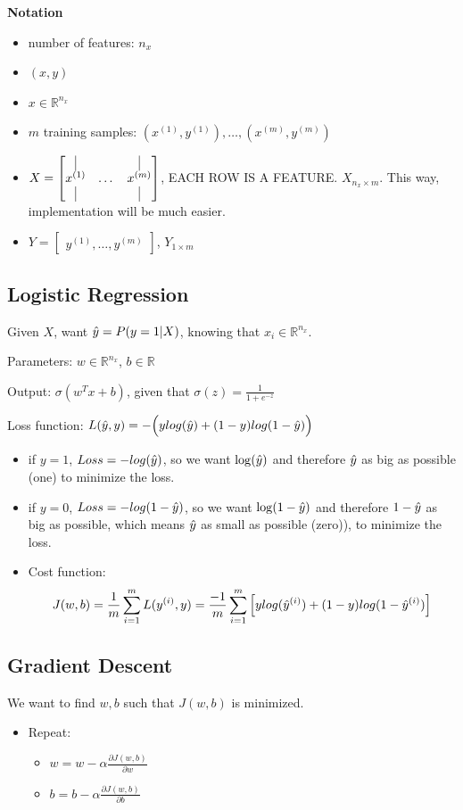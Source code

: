 
\textbf{Notation}
\begin{itemize}
	\item number of features: $n_x$
	\item $(x, y)$
	\item $x \in \mathbb{R}^{n_x}$
	\item $m$ training samples: $(x^{(1)}, y^{(1)}), \dots, (x^{(m)}, y^{(m)})$
	\item $X = \begin{bmatrix}
	\vline & & \vline \\
	x^{(1)} & \dots & x^{(m)}\\ 
	\vline & & \vline \\
	\end{bmatrix}$, EACH ROW IS A FEATURE. $X_{n_x \times m}$. This way, implementation will be much easier. 
	\item $Y = \begin{bmatrix}
	y^{(1)}, \dots, y^{(m)}
	\end{bmatrix}$, $Y_{1\times m}$
\end{itemize}

\subsection{Logistic Regression}
Given $X$, want $\hat{y} = P(y=1|X)$, knowing that $x_i \in \mathbb{R}^{n_x}$. 

Parameters: $w \in \mathbb{R}^{n_x}$, $b \in \mathbb{R}$

Output: $\sigma(w^Tx + b)$, given that $\sigma(z) = \frac{1}{1+e^{-z}}$

Loss function: $L(\hat{y}, y) = -\Big(ylog(\hat{y}) + (1-y)log(1-\hat{y})\Big)$
\begin{itemize}
	\item if $y = 1$, $Loss = - log(\hat{y})$, so we want $\log(\hat{y})$ and therefore $\hat{y}$ as big as possible (one) to minimize the loss. 
	\item if $y = 0$, $Loss = - log(1-\hat{y})$, so we want $\log(1-\hat{y})$ and therefore $1-\hat{y}$ as big as possible, which means $\hat{y}$ as small as possible (zero)), to minimize the loss. 

	\item Cost function: 
$$
J(w, b) = \frac{1}{m} \sum_{i = 1}^{m} L(y^{(i)}, y) = \frac{-1}{m} \sum_{i = 1}^{m} \Big[ylog(\hat{y}^{(i)}) + (1-y)log(1-\hat{y}^{(i)})\Big]
$$
\end{itemize}

\subsection{Gradient Descent}
We want to find $w, b$ such that $J(w, b)$ is minimized. 
\begin{itemize}
	\item Repeat:
	\begin{itemize}
		\item[] $w = w - \alpha \frac{\partial J(w, b)}{\partial w}$
		\item[] $b = b - \alpha \frac{\partial J(w, b)}{\partial b}$
	\end{itemize}
\end{itemize}

